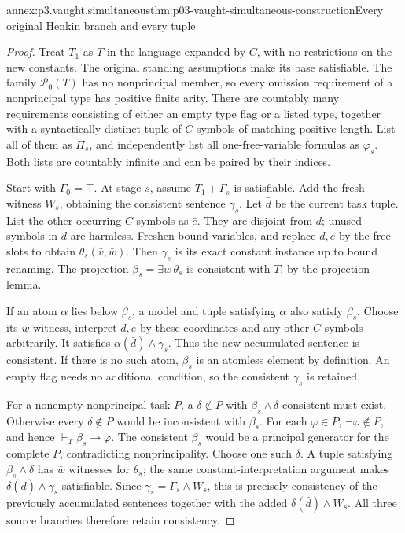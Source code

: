 \begin{annexitem}{annex:p3.vaught.simultaneous}{thm:p03-vaught-simultaneous-construction}{Every original Henkin branch and every tuple}
\begin{proof}
Treat \(T_1\) as \(T\) in the language expanded by \(C\), with no
restrictions on the new constants. The original standing assumptions
make its base satisfiable.
The family \(\mathcal P_0(T)\) has no nonprincipal member, so every
omission requirement of a nonprincipal type has positive finite arity.
There are countably many requirements consisting of either an empty
type flag or a listed type, together with a syntactically distinct
tuple of \(C\)-symbols of matching positive length.
List all of them as \(\Pi_s\), and independently list all
one-free-variable formulas as \(\varphi_s\).
Both lists are countably infinite and can be paired by their indices.

Start with \(\Gamma_0=\top\). At stage \(s\), assume \(T_1+\Gamma_s\)
is satisfiable. Add the fresh witness \(W_s\), obtaining the consistent
sentence \(\gamma_s\). Let \(\bar d\) be the current task tuple.
List the other occurring \(C\)-symbols as \(\bar e\).
They are disjoint from \(\bar d\); unused symbols in \(\bar d\)
are harmless. Freshen bound variables, and replace \(\bar d,\bar e\)
by the free slots to obtain \(\theta_s(\bar v,\bar w)\).
Then \(\gamma_s\) is its exact constant instance up to bound renaming.
The projection \(\beta_s=\exists\bar w\,\theta_s\) is consistent
with \(T\), by the projection lemma.

If an atom \(\alpha\) lies below \(\beta_s\), a model and tuple
satisfying \(\alpha\) also satisfy \(\beta_s\). Choose its \(\bar w\)
witness, interpret \(\bar d,\bar e\) by these coordinates and any
other \(C\)-symbols arbitrarily. It satisfies
\(\alpha(\bar d)\land\gamma_s\). Thus the new accumulated sentence
is consistent.
If there is no such atom, \(\beta_s\) is an atomless element by
definition. An empty flag needs no additional condition, so the
consistent \(\gamma_s\) is retained.

For a nonempty nonprincipal task \(P\), a \(\delta\notin P\) with
\(\beta_s\land\delta\) consistent must exist.
Otherwise every \(\delta\notin P\) would be inconsistent with
\(\beta_s\). For each \(\varphi\in P\), \(\neg\varphi\notin P\),
and hence \(\vdash_T\beta_s\to\varphi\).
The consistent \(\beta_s\) would be a principal generator for the
complete \(P\), contradicting nonprincipality.
Choose one such \(\delta\). A tuple satisfying
\(\beta_s\land\delta\) has \(\bar w\) witnesses for \(\theta_s\);
the same constant-interpretation argument makes
\(\delta(\bar d)\land\gamma_s\) satisfiable.
Since \(\gamma_s=\Gamma_s\land W_s\), this is precisely consistency
of the previously accumulated sentences together with the added
\(\delta(\bar d)\land W_s\).
All three source branches therefore retain consistency.


\end{proof}
\end{annexitem}
